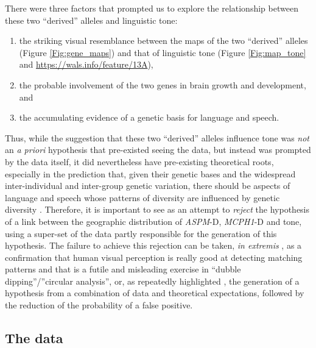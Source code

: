 \documentclass[twoside,onecolumn]{article}
\begin{document}
There were three factors that prompted us to explore the relationship between these two ``derived'' alleles and linguistic tone:

\begin{enumerate}[label={\alph*)}]
	\item the striking visual resemblance between the maps of the two ``derived'' alleles (Figure \ref{Fig:gene_maps}) and that of linguistic tone (Figure \ref{Fig:map_tone} and \url{https://wals.info/feature/13A}),
	\item the probable involvement of the two genes in brain growth and development, and
	\item the accumulating evidence of a genetic basis for language and speech.
\end{enumerate}

Thus, while the suggestion that these two ``derived'' alleles influence tone was \emph{not} an \textit{a priori} hypothesis that pre-existed seeing the data, but instead was prompted by the data itself, it did nevertheless have pre-existing theoretical roots, especially in the prediction that, given their genetic bases and the widespread inter-individual and inter-group genetic variation, there should be aspects of language and speech whose patterns of diversity are influenced by genetic diversity \citep{dediu_msc_2002,dediu_phd_2007}.
Therefore, it is important to see \citet{dediu_ladd_2007} as an attempt to \emph{reject} the hypothesis of a link between the geographic distribution of \textit{ASPM}-D, \textit{MCPH1}-D and tone, using a super-set of the data partly responsible for the generation of this hypothesis.
The failure to achieve this rejection can be taken, \textit{in extremis} \citep{collins_tone_2016}, as a confirmation that human visual perception is really good at detecting matching patterns and that \citet{dediu_ladd_2007} is a futile and misleading exercise in ``dubble dipping''/''circular analysis'', or, as repeatedly highlighted \citep{dediu_ladd_2007,dediu_phd_2007,ladd_bioling_2008}, the generation of a hypothesis from a combination of data and theoretical expectations, followed by the reduction of the probability of a false positive.

\subsection{The data}
\end{document}
